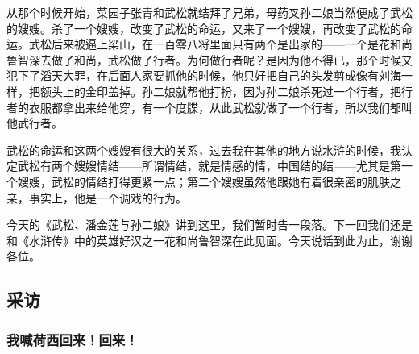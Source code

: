 \par 从那个时候开始，菜园子张青和武松就结拜了兄弟，母药叉孙二娘当然便成了武松的嫂嫂。杀了一个嫂嫂，改变了武松的命运，又来了一个嫂嫂，再改变了武松的命运。武松后来被逼上梁山，在一百零八将里面只有两个是出家的——一个是花和尚鲁智深去做了和尚，武松做了行者。为何做行者呢？是因为他不得已，那个时候又犯下了滔天大罪，在后面人家要抓他的时候，他只好把自己的头发剪成像有刘海一样，把额头上的金印盖掉。孙二娘就帮他打扮，因为孙二娘杀死过一个行者，把行者的衣服都拿出来给他穿，有一个度牒，从此武松就做了一个行者，所以我们都叫他武行者。
\par 武松的命运和这两个嫂嫂有很大的关系，过去我在其他的地方说水浒的时候，我认定武松有两个嫂嫂情结——所谓情结，就是情感的情，中国结的结——尤其是第一个嫂嫂，武松的情结打得更紧一点；第二个嫂嫂虽然他跟她有着很亲密的肌肤之亲，事实上，他是一个调戏的行为。
\par 今天的《武松、潘金莲与孙二娘》讲到这里，我们暂时告一段落。下一回我们还是和《水浒传》中的英雄好汉之一花和尚鲁智深在此见面。今天说话到此为止，谢谢各位。







\subsection{采访}



\subsubsection{我喊荷西回来！回来！}

